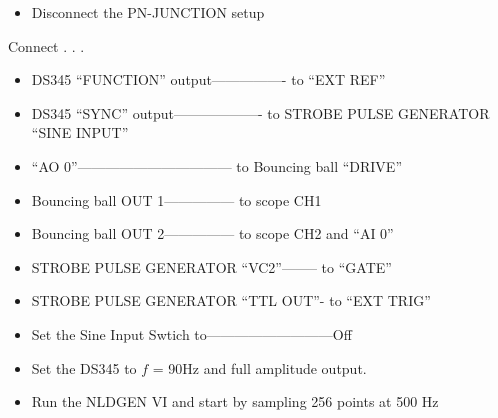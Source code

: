 \documentclass{../lab}
\begin{document}
\begin{itemize}
    \item Disconnect the PN-JUNCTION setup

\end{itemize}

Connect . . .

\newpage

\begin{itemize}
    \item DS345 ``FUNCTION'' output---------------- to ``EXT REF''

    \item DS345 ``SYNC'' output------------------- to STROBE PULSE GENERATOR ``SINE INPUT''

    \item ``AO 0''--------------------------------- to Bouncing ball ``DRIVE''

    \item Bouncing ball OUT 1--------------- to scope CH1

    \item Bouncing ball OUT 2--------------- to scope CH2 and ``AI 0''

    \item STROBE PULSE GENERATOR ``VC2''-------- to ``GATE''

    \item STROBE PULSE GENERATOR ``TTL OUT''- to ``EXT TRIG''

    \item Set the Sine Input Swtich to---------------------------Off

    \item Set the DS345 to $f$ = 90Hz and full amplitude output.

    \item Run the NLDGEN VI and start by sampling 256 points at 500 Hz
\end{itemize}


\end{document}
